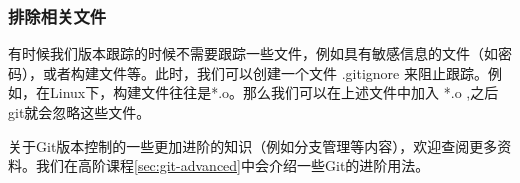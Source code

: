 \documentclass[../main.tex]{subfiles}
\begin{document}
\subsubsection{排除相关文件}

有时候我们版本跟踪的时候不需要跟踪一些文件，例如具有敏感信息的文件（如密码），或者构建文件等。此时，我们可以创建一个文件 .gitignore 来阻止跟踪。例如，在Linux下，构建文件往往是*.o。那么我们可以在上述文件中加入 *.o ,之后git就会忽略这些文件。

关于Git版本控制的一些更加进阶的知识（例如分支管理等内容），欢迎查阅更多资料。我们在高阶课程\ref{sec:git-advanced}中会介绍一些Git的进阶用法。
\end{document}
